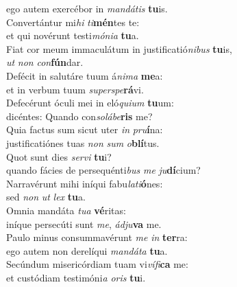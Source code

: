 \evenverse ego autem exercébor in \textit{man}\textit{dá}\textit{tis} \textbf{tu}is.\\
\oddverse Convertántur mi\textit{hi} \textit{ti}\textbf{mén}tes te:~\*\\
\oddverse et qui novérunt testi\textit{mó}\textit{ni}\textit{a} \textbf{tu}a.\\
\evenverse Fiat cor meum immaculátum in justificatió\textit{ni}\textit{bus} \textbf{tu}is,~\*\\
\evenverse \textit{ut} \textit{non} \textit{con}\textbf{fún}dar.\\
\oddverse Defécit in salutáre tuum á\textit{ni}\textit{ma} \textbf{me}a:~\*\\
\oddverse et in verbum tuum \textit{su}\textit{per}\textit{spe}\textbf{rá}vi.\\
\evenverse Defecérunt óculi mei in eló\textit{qui}\textit{um} \textbf{tu}um:~\*\\
\evenverse dicéntes: Quando con\textit{so}\textit{lá}\textit{be}\textbf{ris} me?\\
\oddverse Quia factus sum sicut uter \textit{in} \textit{pru}\textbf{í}na:~\*\\
\oddverse justificatiónes tuas \textit{non} \textit{sum} \textit{o}\textbf{blí}tus.\\
\evenverse Quot sunt dies \textit{ser}\textit{vi} \textbf{tu}i?~\*\\
\evenverse quando fácies de persequénti\textit{bus} \textit{me} \textit{ju}\textbf{dí}cium?\\
\oddverse Narravérunt mihi iníqui fabu\textit{la}\textit{ti}\textbf{ó}nes:~\*\\
\oddverse sed \textit{non} \textit{ut} \textit{lex} \textbf{tu}a.\\
\evenverse Omnia mandáta \textit{tu}\textit{a} \textbf{vé}ritas:~\*\\
\evenverse iníque persecúti sunt \textit{me}, \textit{ád}\textit{ju}\textbf{va} me.\\
\oddverse Paulo minus consummavérunt \textit{me} \textit{in} \textbf{ter}ra:~\*\\
\oddverse ego autem non derelíqui \textit{man}\textit{dá}\textit{ta} \textbf{tu}a.\\
\evenverse Secúndum misericórdiam tuam vi\textit{ví}\textit{fi}\textbf{ca} me:~\*\\
\evenverse et custódiam testimóni\textit{a} \textit{o}\textit{ris} \textbf{tu}i.\\
